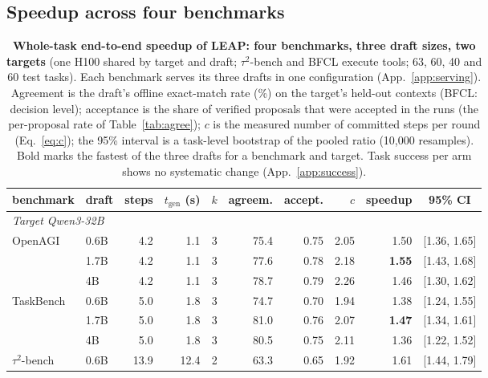 
\subsection{Speedup across four benchmarks}
\label{app:detail:results4}

\begin{table}[t]
\centering
\caption{\textbf{Whole-task end-to-end speedup of LEAP: four benchmarks, three draft sizes, two targets} (one H100
shared by target and draft; $\tau^2$-bench and BFCL execute tools; 63, 60, 40 and 60 test tasks). Each benchmark
serves its three drafts in one configuration (App.~\ref{app:serving}). Agreement is the draft's offline exact-match rate (\%) on the
target's held-out contexts (BFCL: decision level); acceptance is the share of verified proposals that were
accepted in the runs (the per-proposal rate of Table~\ref{tab:agree}); $c$ is the measured number of committed steps per round (Eq.~\ref{eq:c}); the 95\% interval is a
task-level bootstrap of the pooled ratio (10{,}000 resamples). Bold marks the fastest of the three drafts for
a benchmark and target. Task success per arm shows no systematic change (App.~\ref{app:success}).}
\label{tab:four}
\footnotesize\setlength{\tabcolsep}{4pt}\renewcommand{\arraystretch}{0.92}
\begin{tabular}{llrrrrrrrc}
\toprule
benchmark & draft & steps & $t_{\mathrm{gen}}$ (s) & $k$ & agreem. & accept. & $c$ & speedup & 95\% CI \\
\midrule
\multicolumn{10}{l}{\emph{Target Qwen3-32B}} \\
\midrule
\multirow{3}{*}{OpenAGI} & 0.6B & 4.2  & 1.1  & 3 & 75.4 & 0.75 & 2.05 & 1.50\xx{} & [1.36, 1.65] \\
                & 1.7B & 4.2  & 1.1  & 3 & 77.6 & 0.78 & 2.18 & \textbf{1.55\xx{}} & [1.43, 1.68] \\
                & 4B   & 4.2  & 1.1  & 3 & 78.7 & 0.79 & 2.26 & 1.46\xx{} & [1.30, 1.62] \\
\cmidrule(lr){2-10}
\multirow{3}{*}{TaskBench} & 0.6B & 5.0  & 1.8  & 3 & 74.7 & 0.70 & 1.94 & 1.38\xx{} & [1.24, 1.55] \\
                & 1.7B & 5.0  & 1.8  & 3 & 81.0 & 0.76 & 2.07 & \textbf{1.47\xx{}} & [1.34, 1.61] \\
                & 4B   & 5.0  & 1.8  & 3 & 80.5 & 0.75 & 2.11 & 1.36\xx{} & [1.22, 1.52] \\
\cmidrule(lr){2-10}
\multirow{3}{*}{$\tau^2$-bench} & 0.6B & 13.9 & 12.4 & 2 & 63.3 & 0.65 & 1.92 & 1.61\xx{} & [1.44, 1.79] \\

\end{tabular}
\end{table}
